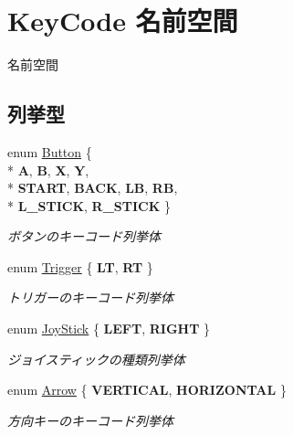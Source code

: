 \hypertarget{namespace_key_code}{}\section{Key\+Code 名前空間}
\label{namespace_key_code}


名前空間  


\subsection*{列挙型}
\begin{DoxyCompactItemize}
\item 
enum \hyperlink{namespace_key_code_a03bfec859eac87be20f8952c1eb89de0}{Button} \{ \\*
{\bfseries A}, 
{\bfseries B}, 
{\bfseries X}, 
{\bfseries Y}, 
\\*
{\bfseries S\+T\+A\+RT}, 
{\bfseries B\+A\+CK}, 
{\bfseries LB}, 
{\bfseries RB}, 
\\*
{\bfseries L\+\_\+\+S\+T\+I\+CK}, 
{\bfseries R\+\_\+\+S\+T\+I\+CK}
 \}\begin{DoxyCompactList}\small\item\em ボタンのキーコード列挙体 \end{DoxyCompactList}
\item 
enum \hyperlink{namespace_key_code_a68dc8420d4850fe68378bc682c360e30}{Trigger} \{ {\bfseries LT}, 
{\bfseries RT}
 \}\hypertarget{namespace_key_code_a68dc8420d4850fe68378bc682c360e30}{}\label{namespace_key_code_a68dc8420d4850fe68378bc682c360e30}
\begin{DoxyCompactList}\small\item\em トリガーのキーコード列挙体 \end{DoxyCompactList}
\item 
enum \hyperlink{namespace_key_code_af3282177b831055ef900d2bf53e100db}{Joy\+Stick} \{ {\bfseries L\+E\+FT}, 
{\bfseries R\+I\+G\+HT}
 \}\hypertarget{namespace_key_code_af3282177b831055ef900d2bf53e100db}{}\label{namespace_key_code_af3282177b831055ef900d2bf53e100db}
\begin{DoxyCompactList}\small\item\em ジョイスティックの種類列挙体 \end{DoxyCompactList}
\item 
enum \hyperlink{namespace_key_code_a16ba82423f2a8ac640d047568347eee4}{Arrow} \{ {\bfseries V\+E\+R\+T\+I\+C\+AL}, 
{\bfseries H\+O\+R\+I\+Z\+O\+N\+T\+AL}
 \}\hypertarget{namespace_key_code_a16ba82423f2a8ac640d047568347eee4}{}\label{namespace_key_code_a16ba82423f2a8ac640d047568347eee4}
\begin{DoxyCompactList}\small\item\em 方向キーのキーコード列挙体 \end{DoxyCompactList}
\end{DoxyCompactItemize}


